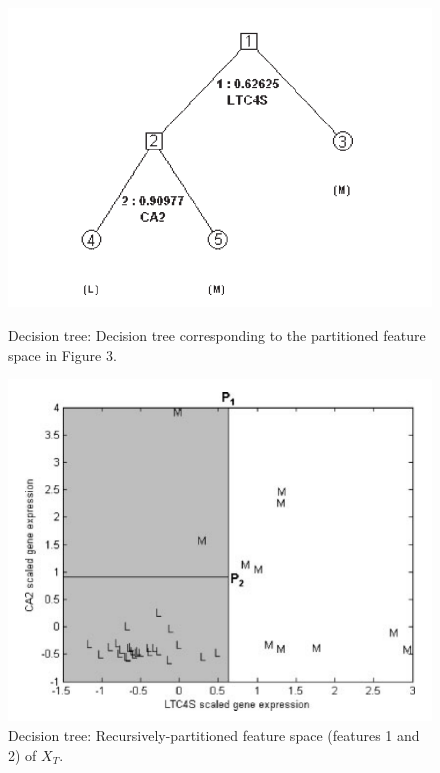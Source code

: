 \documentclass[a4paper]{article}
\begin{document}
\begin{figure}[H]
    \centering
    \begin{minipage}{0.48\textwidth}
      \centering
      \includegraphics[width=\linewidth]{./images/Decision tree.png}
      \caption{Decision tree: Decision tree corresponding to the partitioned feature space in Figure 3.\cite{ref_dt1}}
      \label{fig.Decision tree}
    \end{minipage}
    \begin{minipage}{0.48\textwidth}
      \centering
      \includegraphics[width=\linewidth]{./images/Decision tree-Recursively-partitioned feature space.png}
      \caption{Decision tree: Recursively-partitioned feature space (features 1 and 2) of $X_T$.\cite{ref_dt1}}
      \label{fig.Decision tree-data}
    \end{minipage}\hfill
\end{figure}
\end{document}
